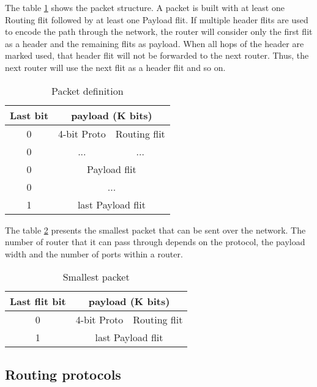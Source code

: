 The table \ref{packet_definition} shows the packet structure. A packet is built with at least one Routing flit followed
by at least one Payload flit. If multiple header flits are used to encode the path through the network, the router will
consider only the first flit as a header and the remaining flits as payload. When all hops of the header are marked
used, that header flit will not be forwarded to the next router. Thus, the next router will use the next flit as a
header flit and so on.

\begin{table}[h]
  \centering
  \begin{tabular}{c | c | c}
    \toprule\hline
    \textbf{Last bit} & \multicolumn{2}{c}{\textbf{payload (K bits)}} \\
    \hline\hline
    0 & 4-bit Proto & Routing flit \\
    \hline
    0 & ... & ... \\
    \hline
    0 & \multicolumn{2}{c}{Payload flit} \\
    \hline
    0 & \multicolumn{2}{c}{...} \\
    \hline
    1 & \multicolumn{2}{c}{last Payload flit} \\
    \hline\bottomrule
  \end{tabular}
  \caption{\label{packet_definition} Packet definition}
\end{table}


The table \ref{smallest_packet} presents the smallest packet that can be sent over the network. The number of router
that it can pass through depends on the protocol, the payload width and the number of ports within a router.

\begin{table}[h]
  \centering
  \begin{tabular}{c | c | c}
    \toprule\hline
    \textbf{Last flit bit} & \multicolumn{2}{c}{\textbf{payload (K bits)}} \\
    \hline\hline
    0 & 4-bit Proto & Routing flit \\
    \hline
    1 & \multicolumn{2}{c}{last Payload flit} \\
    \hline\bottomrule
  \end{tabular}
  \caption{\label{smallest_packet} Smallest packet}
\end{table}


\subsection{Routing protocols}

